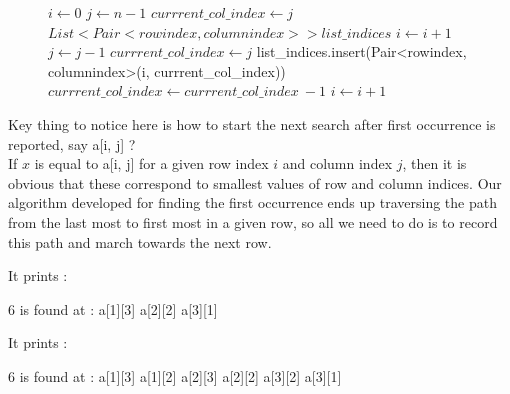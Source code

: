 \begin{figure}[H]
\begin{center}
\end{center}
\begin{algorithmic}[1]
    \State $i \gets 0$
    \State $j \gets n - 1$
    \State $currrent\_col\_index \gets j$
    \State $List<Pair<rowindex, columnindex> > list\_indices$
                \State $i \gets i + 1$
               \State $j \gets j - 1$
               \State $currrent\_col\_index \gets j$
                      \State list\_indices.insert(Pair<rowindex, columnindex>(i, currrent\_col\_index))
                     \State $currrent\_col\_index \gets currrent\_col\_index\ - 1$
                   \EndWhile
                \State $i \gets i + 1$
            \EndIf
        \EndWhile
\EndFunction
\end{algorithmic}
\end{figure}

Key thing to notice here is how to start the next search after first occurrence is reported, say a[i, j] ?
\vspace{1mm}\\
If $x$ is equal to a[i, j] for a given row index $i$ and column index $j$, then it is obvious that these correspond to smallest values of row and column indices. Our algorithm developed for finding the first occurrence ends up traversing the path from the last most to first most in a given row, so all we need to do is to record this path and march towards the next row.





It prints :
\begin{boxedverbatim}
6 is found at : 
a[1][3]
a[2][2]
a[3][1]
\end{boxedverbatim}



It prints :
\begin{boxedverbatim}
6 is found at : 
a[1][3]
a[1][2]
a[2][3]
a[2][2]
a[3][2]
a[3][1]
\end{boxedverbatim}  

